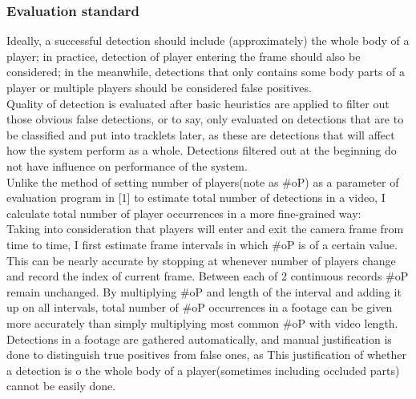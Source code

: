 \documentclass{article}
\begin{document}
\subsubsection{Evaluation standard}
Ideally, a successful detection should include (approximately) the whole body of a player; in practice, detection of player entering the frame should also be considered; in the meanwhile, detections that only contains some body parts of a player or multiple players should be considered false positives.\\
Quality of detection is evaluated after basic heuristics are applied to filter out those obvious false detections, or to say, only evaluated on detections that are to be classified and put into tracklets later, as these are detections that will affect how the system perform as a whole. Detections filtered out at the beginning do not have influence on performance of the system.\\
Unlike the method of setting number of players(note as $\#$oP) as a parameter of evaluation program in [1] to estimate total number of detections in a video, I calculate total number of player occurrences in a more fine-grained way:\\
Taking into consideration that players will enter and exit the camera frame from time to time, I first estimate frame intervals in which $\#$oP is of a certain value. This can be nearly accurate by stopping at whenever number of players change and record the index of current frame. Between each of 2 continuous records $\#$oP remain unchanged. By multiplying $\#$oP and length of the interval and adding it up on all intervals, total number of $\#$oP occurrences in a footage can be given more accurately than simply multiplying most common $\#$oP with video length.\\
Detections in a footage are gathered automatically, and manual justification is done to distinguish true positives from false ones, as This justification of whether a detection is o the whole body of a player(sometimes including occluded parts) cannot be easily done. \\
\end{document}
